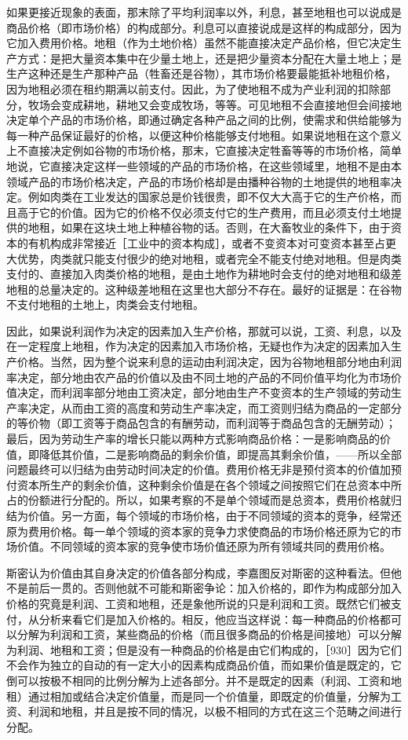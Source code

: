 如果更接近现象的表面，那末除了平均利润率以外，利息，甚至地租也可以说成是商品价格（即市场价格）的构成部分。利息可以直接说成是这样的构成部分，因为它加入费用价格。地租（作为土地价格）虽然不能直接决定产品价格，但它决定生产方式：是把大量资本集中在少量土地上，还是把少量资本分配在大量土地上；是生产这种还是生产那种产品（牲畜还是谷物），其市场价格要最能抵补地租价格，因为地租必须在租约期满以前支付。因此，为了使地租不成为产业利润的扣除部分，牧场会变成耕地，耕地又会变成牧场，等等。可见地租不会直接地但会间接地决定单个产品的市场价格，即通过确定各种产品之间的比例，使需求和供给能够为每一种产品保证最好的价格，以便这种价格能够支付地租。如果说地租在这个意义上不直接决定例如谷物的市场价格，那末，它直接决定牲畜等等的市场价格，简单地说，它直接决定这样一些领域的产品的市场价格，在这些领域里，地租不是由本领域产品的市场价格决定，产品的市场价格却是由播种谷物的土地提供的地租率决定。例如肉类在工业发达的国家总是价钱很贵，即不仅大大高于它的生产价格，而且高于它的价值。因为它的价格不仅必须支付它的生产费用，而且必须支付土地提供的地租，如果在这块土地上种植谷物的话。否则，在大畜牧业的条件下，由于资本的有机构成非常接近［工业中的资本构成］，或者不变资本对可变资本甚至占更大优势，肉类就只能支付很少的绝对地租，或者完全不能支付绝对地租。但是肉类支付的、直接加入肉类价格的地租，是由土地作为耕地时会支付的绝对地租和级差地租的总量决定的。这种级差地租在这里也大部分不存在。最好的证据是：在谷物不支付地租的土地上，肉类会支付地租。

因此，如果说利润作为决定的因素加入生产价格，那就可以说，工资、利息，以及在一定程度上地租，作为决定的因素加入市场价格，无疑也作为决定的因素加入生产价格。当然，因为整个说来利息的运动由利润决定，因为谷物地租部分地由利润率决定，部分地由农产品的价值以及由不同土地的产品的不同价值平均化为市场价值决定，而利润率部分地由工资决定，部分地由生产不变资本的生产领域的劳动生产率决定，从而由工资的高度和劳动生产率决定，而工资则归结为商品的一定部分的等价物（即工资等于商品包含的有酬劳动，而利润等于商品包含的无酬劳动）；最后，因为劳动生产率的增长只能以两种方式影响商品价格：一是影响商品的价值，即降低其价值，二是影响商品的剩余价值，即提高其剩余价值，——所以全部问题最终可以归结为由劳动时间决定的价值。费用价格无非是预付资本的价值加预付资本所生产的剩余价值，这种剩余价值是在各个领域之间按照它们在总资本中所占的份额进行分配的。所以，如果考察的不是单个领域而是总资本，费用价格就归结为价值。另一方面，每个领域的市场价格，由于不同领域的资本的竞争，经常还原为费用价格。每一单个领域的资本家的竞争力求使商品的市场价格还原为它的市场价值。不同领域的资本家的竞争使市场价值还原为所有领域共同的费用价格。

斯密认为价值由其自身决定的价值各部分构成，李嘉图反对斯密的这种看法。但他不是前后一贯的。否则他就不可能和斯密争论：加入价格的，即作为构成部分加入价格的究竟是利润、工资和地租，还是象他所说的只是利润和工资。既然它们被支付，从分析来看它们是加入价格的。相反，他应当这样说：每一种商品的价格都可以分解为利润和工资，某些商品的价格（而且很多商品的价格是间接地）可以分解为利润、地租和工资；但是没有一种商品的价格是由它们构成的，［930］因为它们不会作为独立的自动的有一定大小的因素构成商品价值，而如果价值是既定的，它倒可以按极不相同的比例分解为上述各部分。并不是既定的因素（利润、工资和地租）通过相加或结合决定价值量，而是同一个价值量，即既定的价值量，分解为工资、利润和地租，并且是按不同的情况，以极不相同的方式在这三个范畴之间进行分配。

